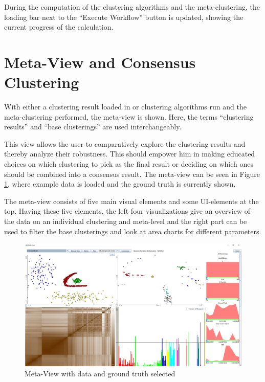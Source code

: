 \documentclass[
	a4paper,
	english,
	twoside,
	openright,               
	11pt                            
	]{report}
\begin{document}
During the computation of the clustering algorithms and the meta-clustering, the loading bar next to the ``Execute Workflow'' button is updated, showing the current progress of the calculation.

\section{Meta-View and Consensus Clustering}
With either a clustering result loaded in or clustering algorithms run and the meta-clustering performed, the meta-view is shown. Here, the terms ``clustering results'' and ``base clusterings'' are used interchangeably.

This view allows the user to comparatively explore the clustering results and thereby analyze their robustness. This should empower him in making educated choices on which clustering to pick as the final result or deciding on which ones should be combined into a consensus result. The meta-view can be seen in Figure \ref{fig:meta-view}, where example data is loaded and the ground truth is currently shown.

The meta-view consists of five main visual elements and some UI-elements at the top. Having these five elements, the left four visualizations give an overview of the data on an individual clustering and meta-level and the right part can be used to filter the base clusterings and look at area charts for different parameters. 

\begin{figure}[H]
	\centering
	\includegraphics[angle=-90,origin=c,scale=.47]{meta-view}
	\caption{Meta-View with data and ground truth selected}
	\label{fig:meta-view}
\end{figure}
\end{document}
